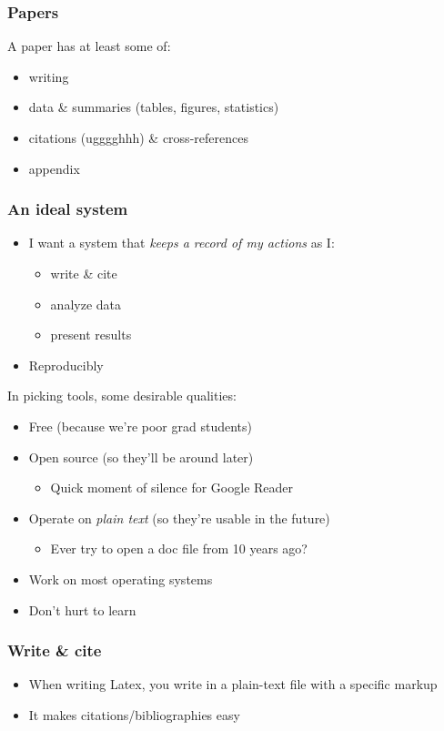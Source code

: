 \documentclass[bigger, aspectratio=169]{beamer}
\begin{document}
\begin{frame}
  \frametitle{Papers}
  A paper has at least some of:
  \begin{itemize}
  \item writing
  \item data \& summaries (tables, figures, statistics)
  \item citations (ugggghhh) \& cross-references
  \item appendix
  \end{itemize}
\end{frame}

\begin{frame}
  \frametitle{An ideal system}
  \begin{itemize}
  \item I want a system that \emph{keeps a record of my actions} as I:\@
    \begin{itemize}
    \item write \& cite
    \item analyze data
    \item present results
    \end{itemize}
  \item Reproducibly 
  \end{itemize}
\end{frame}

\begin{frame}
  In picking tools, some desirable qualities:
  \begin{itemize}
  \item Free (because we're poor grad students)
  \item Open source (so they'll be around later) 
    \begin{itemize}
    \item Quick moment of silence for Google Reader
    \end{itemize}
  \item Operate on \emph{plain text} (so they're usable in the future)
    \begin{itemize}
    \item Ever try to open a doc file from 10 years ago?
    \end{itemize}
  \item Work on most operating systems
  \item Don't hurt to learn
  \end{itemize}
\end{frame}

\begin{frame}
  \frametitle{Write \& cite}
  \begin{itemize}
  \item When writing Latex, you write in a plain-text file with a specific markup 
  \item It makes citations/bibliographies easy
  \end{itemize}
\end{frame}
\end{document}
